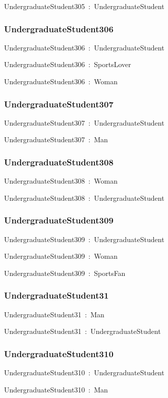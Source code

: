 \documentclass{article}
\begin{document}
UndergraduateStudent305~:~UndergraduateStudent

\subsubsection*{UndergraduateStudent306}

UndergraduateStudent306~:~UndergraduateStudent

UndergraduateStudent306~:~SportsLover

UndergraduateStudent306~:~Woman

\subsubsection*{UndergraduateStudent307}

UndergraduateStudent307~:~UndergraduateStudent

UndergraduateStudent307~:~Man

\subsubsection*{UndergraduateStudent308}

UndergraduateStudent308~:~Woman

UndergraduateStudent308~:~UndergraduateStudent

\subsubsection*{UndergraduateStudent309}

UndergraduateStudent309~:~UndergraduateStudent

UndergraduateStudent309~:~Woman

UndergraduateStudent309~:~SportsFan

\subsubsection*{UndergraduateStudent31}

UndergraduateStudent31~:~Man

UndergraduateStudent31~:~UndergraduateStudent

\subsubsection*{UndergraduateStudent310}

UndergraduateStudent310~:~UndergraduateStudent

UndergraduateStudent310~:~Man
\end{document}
